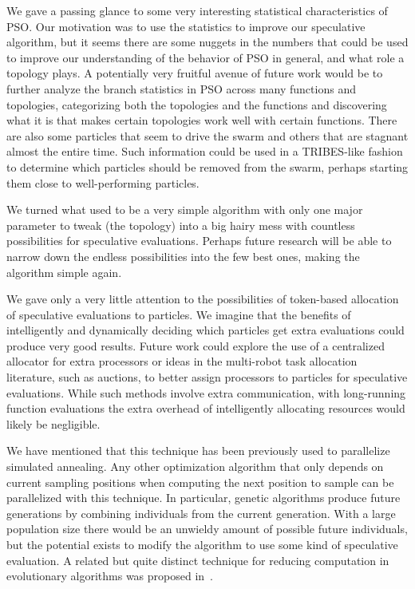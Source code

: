 \documentclass[journal,letterpaper]{IEEEtran}
\begin{document}
We gave a passing glance to some very interesting statistical characteristics
of PSO.  Our motivation was to use the statistics to improve our speculative
algorithm, but it seems there are some nuggets in the numbers that could be
used to improve our understanding of the behavior of PSO in general, and what
role a topology plays.  A potentially very fruitful avenue of future work would
be to further analyze the branch statistics in PSO across many functions and
topologies, categorizing both the topologies and the functions and discovering
what it is that makes certain topologies work well with certain functions.
There are also some particles that seem to drive the swarm and others that are
stagnant almost the entire time.  Such information could be used in a
TRIBES-like fashion to determine which particles should be removed from the
swarm, perhaps starting them close to well-performing particles.

We turned what used to be a very simple algorithm with only one major parameter
to tweak (the topology) into a big hairy mess with countless possibilities for
speculative evaluations.  Perhaps future research will be able to narrow down
the endless possibilities into the few best ones, making the algorithm simple
again.

We gave only a very little attention to the possibilities of token-based
allocation of speculative evaluations to particles.  We imagine that the
benefits of intelligently and dynamically deciding which particles get extra
evaluations could produce very good results.  Future work could explore the use
of a centralized allocator for extra processors or ideas in the multi-robot
task allocation literature, such as auctions, to better assign processors to
particles for speculative evaluations.  While such methods involve extra
communication, with long-running function evaluations the extra overhead of
intelligently allocating resources would likely be negligible.

We have mentioned that this technique has been previously used to parallelize
simulated annealing.  Any other optimization algorithm that only depends on 
current sampling positions when computing the next position to sample can be
parallelized with this technique.  In particular, genetic algorithms produce
future generations by combining individuals from the current generation.  With
a large population size there would be an unwieldy amount of possible future
individuals, but the potential exists to modify the algorithm to use some kind
of speculative evaluation.  A related but quite distinct technique for reducing
computation in evolutionary algorithms was proposed in~\cite{poli-ai06}.
\end{document}

